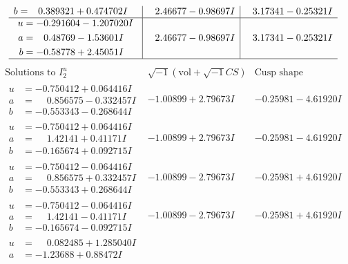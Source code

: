 \documentclass[1p]{elsarticle_modified}
\theoremstyle{definition}
\newcommand{\I}{\sqrt{-1}}
\begin{document}
$$\begin{array}{c|c|c}
\begin{aligned}
b &= \phantom{-}0.389321 + 0.474702 I\end{aligned}
 & \phantom{-}2.46677 - 0.98697 I & \phantom{-}3.17341 - 0.25321 I \\ \hline\begin{aligned}
u &= -0.291604 - 1.207020 I \\
a &= \phantom{-}0.48769 - 1.53601 I \\
b &= -0.58778 + 2.45051 I\end{aligned}
 & \phantom{-}2.46677 - 0.98697 I & \phantom{-}3.17341 - 0.25321 I\\
 \hline 
 \end{array}$$\newpage$$\begin{array}{c|c|c}  
\text{Solutions to }I^u_{2}& \I (\text{vol} + \sqrt{-1}CS) & \text{Cusp shape}\\
 \hline 
\begin{aligned}
u &= -0.750412 + 0.064416 I \\
a &= \phantom{-}0.856575 - 0.332457 I \\
b &= -0.553343 - 0.268644 I\end{aligned}
 & -1.00899 + 2.79673 I & -0.25981 - 4.61920 I \\ \hline\begin{aligned}
u &= -0.750412 + 0.064416 I \\
a &= \phantom{-}1.42141 + 0.41171 I \\
b &= -0.165674 + 0.092715 I\end{aligned}
 & -1.00899 + 2.79673 I & -0.25981 - 4.61920 I \\ \hline\begin{aligned}
u &= -0.750412 - 0.064416 I \\
a &= \phantom{-}0.856575 + 0.332457 I \\
b &= -0.553343 + 0.268644 I\end{aligned}
 & -1.00899 - 2.79673 I & -0.25981 + 4.61920 I \\ \hline\begin{aligned}
u &= -0.750412 - 0.064416 I \\
a &= \phantom{-}1.42141 - 0.41171 I \\
b &= -0.165674 - 0.092715 I\end{aligned}
 & -1.00899 - 2.79673 I & -0.25981 + 4.61920 I \\ \hline\begin{aligned}
u &= \phantom{-}0.082485 + 1.285040 I \\
a &= -1.23688 + 0.88472 I \\

\end{aligned}
\end{array}$$
\end{document}
